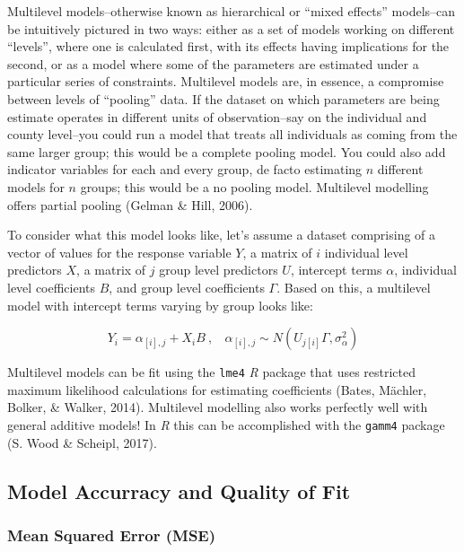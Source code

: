 \documentclass[12pt,twoside]{reedthesis}
\begin{document}
  Multilevel models--otherwise known as hierarchical or ``mixed effects''
  models--can be intuitively pictured in two ways: either as a set of
  models working on different ``levels'', where one is calculated first,
  with its effects having implications for the second, or as a model where
  some of the parameters are estimated under a particular series of
  constraints. Multilevel models are, in essence, a compromise between
  levels of ``pooling'' data. If the dataset on which parameters are being
  estimate operates in different units of observation--say on the
  individual and county level--you could run a model that treats all
  individuals as coming from the same larger group; this would be a
  complete pooling model. You could also add indicator variables for each
  and every group, de facto estimating \(n\) different models for \(n\)
  groups; this would be a no pooling model. Multilevel modelling offers
  partial pooling (Gelman \& Hill, 2006).
  
  To consider what this model looks like, let's assume a dataset
  comprising of a vector of values for the response variable \(Y\), a
  matrix of \(i\) individual level predictors \(X\), a matrix of \(j\)
  group level predictors \(U\), intercept terms \(\alpha\), individual
  level coefficients \(B\), and group level coefficients \(\Gamma\). Based
  on this, a multilevel model with intercept terms varying by group looks
  like:
  
  \[Y_i = \alpha_{[i], j} + X_iB~,~~~~\alpha_{[i], j} \sim N(U_{j[i]}\Gamma, \sigma_{\alpha}^2)\]
  
  Multilevel models can be fit using the \texttt{lme4} \textit{R} package
  that uses restricted maximum likelihood calculations for estimating
  coefficients (Bates, Mächler, Bolker, \& Walker, 2014). Multilevel
  modelling also works perfectly well with general additive models! In
  \textit{R} this can be accomplished with the \texttt{gamm4} package (S.
  Wood \& Scheipl, 2017).
  
  \subsection{Model Accurracy and Quality of
  Fit}\label{model-accurracy-and-quality-of-fit}
  
  \subsubsection{Mean Squared Error (MSE)}\label{mean-squared-error-mse}
  
\end{document}
